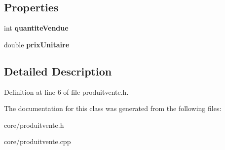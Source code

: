 \subsection*{Properties}
\begin{DoxyCompactItemize}
\item 
\hypertarget{class_produit_vente_ad3d08eebb0f3b1b468025792c8845a7e}{
int {\bfseries quantiteVendue}}
\label{class_produit_vente_ad3d08eebb0f3b1b468025792c8845a7e}

\item 
\hypertarget{class_produit_vente_af018cdfe3b341b1df8f9eefddedb113d}{
double {\bfseries prixUnitaire}}
\label{class_produit_vente_af018cdfe3b341b1df8f9eefddedb113d}

\end{DoxyCompactItemize}


\subsection{Detailed Description}


Definition at line 6 of file produitvente.h.



The documentation for this class was generated from the following files:\begin{DoxyCompactItemize}
\item 
core/produitvente.h\item 
core/produitvente.cpp\end{DoxyCompactItemize}
